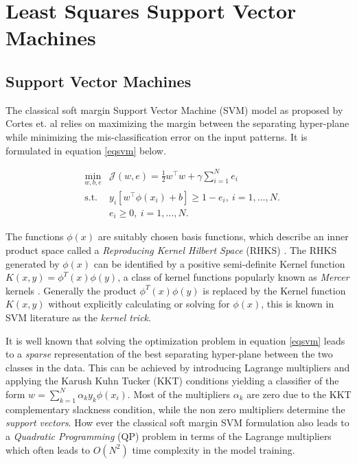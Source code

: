 \chapter{Least Squares Support Vector Machines}
\label{cha:1}
\section{Support Vector Machines} \label{SVM}
 
The classical soft margin Support Vector Machine (SVM) model as proposed by Cortes et. al \cite{Cortes} relies on maximizing the margin between the separating hyper-plane while minimizing the mis-classification error on the input patterns. It is formulated in equation \eqref{eqsvm} below.

\begin{equation}\label{eqsvm}
\begin{aligned}
& \underset{w,b,e}{\text{min}} &
 \mathcal{J}(w,e) = \frac{1}{2}w^{\intercal}w + \gamma\sum\limits_{i=1}^N e_{i} \\
& \text{s.t.} &
y_{i}[ w^{\intercal}\phi(x_{i})+b ] \geq 1 - e_{i},\ i=1,\ldots ,N. \\
& & e_{i} \geq 0,\ i=1,\ldots ,N.
\end{aligned}
\end{equation}

The functions $\phi(x)$ are suitably chosen basis functions, which describe an inner product space called a \textit{Reproducing Kernel Hilbert Space} (RHKS) \cite{N.Aronszjan1950}. The RHKS generated by $\phi(x)$ can be identified by a positive semi-definite Kernel function $K(x, y) = \phi^{T}(x)\phi(y)$, a class of kernel functions popularly known as \textit{Mercer} kernels \cite{Mercer}. Generally the product $\phi^{T}(x)\phi(y)$ is replaced by the Kernel function $K(x, y)$ without explicitly calculating or solving for $\phi(x)$, this is known in SVM literature as the \textit{kernel trick}.

It is well known that solving the optimization problem in equation \eqref{eqsvm} leads to a \textit{sparse} representation of the best separating hyper-plane between the two classes in the data. This can be achieved by introducing Lagrange multipliers and applying the Karush Kuhn Tucker (KKT) conditions yielding a classifier of the form $w = \sum\limits_{k=1}^N \alpha_k y_k \phi(x_{i})$. Most of the multipliers $\alpha_k$ are zero due to the KKT complementary slackness condition, while the non zero multipliers determine the \textit{support vectors}. How ever the classical soft margin SVM formulation also leads to a \textit{Quadratic Programming} (QP) problem in terms of the Lagrange multipliers which often leads to $O(N^2)$ time complexity in the model training.

